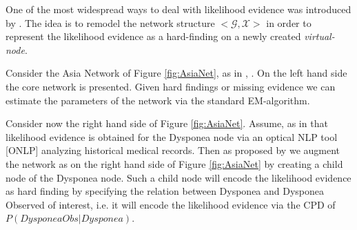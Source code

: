 \documentclass[11pt]{article}
\begin{document}
One of the most widespread ways to deal with likelihood evidence
was introduced by \cite{pearl2014probabilistic}. The idea is to
remodel the network structure \(<\mathscr{G}, \mathscr{X}>\) in order
to represent the likelihood evidence as a hard-finding on a newly
created \emph{virtual-node}.

Consider the Asia Network of Figure \ref{fig:AsiaNet}, as in
\cite{Wasserkrug_all}, \cite{Mrad_2015}. On the left hand side the core
network is presented. Given hard findings or missing evidence we
can estimate the parameters of the network via the standard
EM-algorithm.

Consider now the right hand side of Figure \ref{fig:AsiaNet}. Assume,
as in \cite{Wasserkrug_all} that likelihood evidence is obtained for
the Dysponea node via an optical NLP tool [ONLP] analyzing
historical medical records. Then as proposed by
\cite{pearl2014probabilistic} we augment the network as on the right
hand side of Figure \ref{fig:AsiaNet} by creating a child node of the
Dysponea node. Such a child node will encode the likelihood
evidence as hard finding by specifying the relation between
Dysponea and Dysponea Observed of interest, i.e. it will encode the
likelihood evidence via the CPD of \(P(DysponeaObs | Dysponea)\).
\end{document}
